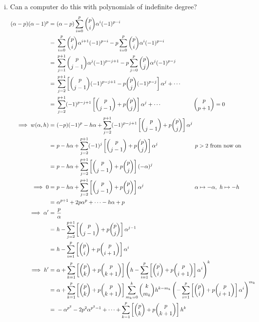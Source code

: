 \documentclass{rs}
\theoremstyle{definition}
\theoremstyle{remark}
\newcommand{\A}{\alpha}
\renewcommand{\=}{\approx}
\renewcommand{\-}{\sim}
\renewcommand{\c}[2]{{#1 \choose #2}}
\numberwithin{equation}{section}
\numberwithin{thm}{section}
\begin{document}
\begin{enumerate}[(i)]
 \item Can a computer do this with polynomials of indefinite degree?  
 \[
  \begin{split}
   (\A - p) (\A - 1)^p = & ~ (\A - p) \sum_{i = 0}^p \c{p}{i} \A^i (-1)^{p - i} \\
                       = & ~ \sum_{i = 0}^p \c{p}{i} \A^{i + 1} (-1)^{p - i} - p \sum_{i = 0}^p \c{p}{i} \A^i (-1)^{p - i} \\
                       = & ~ \sum_{j = 1}^{p + 1} \c{p}{j - 1} \A^j (-1)^{p - j + 1} - p \sum_{j = 0}^p \c{p}{j} \A^j (-1)^{p - j} \\
                       = & ~ \sum_{j = 2}^{p + 1} \left[ \c{p}{j - 1} (-1)^{p - j + 1} - p \c{p}{j} (-1)^{p - j} \right] \A^j + \cdots \\
                       = & ~ \sum_{j = 2}^{p + 1} (-1)^{p - j + 1} \left[ \c{p}{j - 1} + p \c{p}{j} \right] \A^j + \cdots \hskip 2cm \c{p}{p + 1} = 0 \\
      \implies w(\A,h) = & ~ (-p) (-1)^p - h \A + \sum_{j = 2}^{p + 1} (-1)^{p - j + 1} \left[ \c{p}{j - 1} + p \c{p}{j} \right] \A^j \\
                       = & ~ p - h \A + \sum_{j = 2}^{p + 1} (-1)^j \left[ \c{p}{j - 1} + p \c{p}{j} \right] \A^j \hskip 2.3cm \text{$p > 2$ from now on} \\
                       = & ~ p - h \A + \sum_{j = 2}^{p + 1} \left[ \c{p}{j - 1} + p \c{p}{j} \right] (-\A)^j \\
            \implies 0 = & ~ p - h \A + \sum_{j = 2}^{p + 1} \left[ \c{p}{j - 1} + p \c{p}{j} \right] \A^j \hskip 3.15cm \A \mapsto -\A, ~ h \mapsto -h \\
                       = & ~ \A^{p + 1} + 2 p \A^p + \cdots - h \A + p \\
          \implies \A' = & ~ \frac{p}{\A} \\
                       = & ~ h - \sum_{j = 2}^{p + 1} \left[ \c{p}{j - 1} + p \c{p}{j} \right] \A^{j - 1} \\
                       = & ~ h - \sum_{i = 1}^p \left[ \c{p}{i} + p \c{p}{i + 1} \right] \A^i \\
           \implies h' = & ~ \A + \sum_{k = 1}^p \left[ \c{p}{k} + p \c{p}{k + 1} \right] \left( h - \sum_{i = 1}^p \left[ \c{p}{i} + p \c{p}{i + 1} \right] \A^i \right)^k \\
                       = & ~ \A + \sum_{k = 1}^p \left[ \c{p}{k} + p \c{p}{k + 1} \right] \sum_{m_k = 0}^k \c{k}{m_k} h^{k - m_k} \left( - \sum_{i = 1}^p \left[ \c{p}{i} + p \c{p}{i + 1} \right] \A^i \right)^{m_k} \\
                       = & ~ -\A^{p^2} - 2 p^2 \A^{p^2 - 1} + \cdots + \sum_{k = 1}^p \left[ \c{p}{k} + p \c{p}{k + 1} \right] h^k 
  \end{split}
 \]


\end{enumerate}
\end{document}

